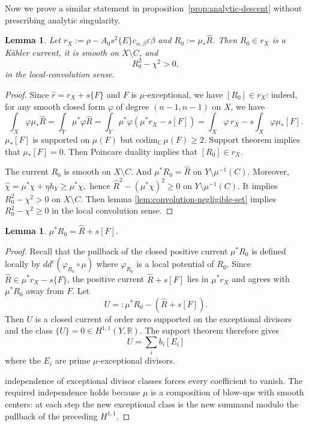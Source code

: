 \documentclass[reqno]{amsart}
\theoremstyle{remark}
\def\R{\mathbb{R}}
\def\C{\mathbb{C}}
\newcommand{\ddc}{dd^c}
\newcommand{\cab}{c_{\alpha,\beta}}
\theoremstyle{plain}
\newtheorem{lemma}[thm]{Lemma}
\begin{document}
Now we prove a similar statement in proposition~\ref{prop:analytic-descent} without prescribing analytic singularity. 
\begin{lemma}
\label{lem:raw-pushdown}
Let $r_X:=\rho-A_0s^2\{E\}\cab\varepsilon\beta$ and $R_0:=\mu_*\widehat R$.  Then $R_0\in r_X$ is a K\"ahler
current, it is smooth on $X\setminus C$, and
\[
 R_0^2-\chi^2>0,
\]
in the local-convolution sense.
\end{lemma}
\begin{proof}
    Since $\widehat{r}=r_X+s\{F\}$ and $F$ is $\mu$-exceptional, we have $[R_0]\in r_X$: indeed, for any smooth closed form $\varphi$ of degree $(n-1,n-1)$ on $X$, we have \[
    \int_X\varphi \mu_*\widehat{R}=\int_Y\mu^*\varphi \widehat{R}=\int_{Y}\mu^*\varphi( \mu^* r_X-s[F])=\int_X\varphi\,r_X-s\int_X\varphi \mu_*[F].
    \]
    $\mu_*[F]$ is supported on $\mu(F)$ but $\text{codim}_\C\,\mu(F)\geq 2$. Support theorem implies that $\mu_*[F]=0$. Then Poincare duality implies that $[R_0]\in r_X. $

    The current $R_0$ is smooth on $X\setminus C$. And $\mu^* R_0=\widehat{R}$ on $Y\setminus \mu^{-1}(C)$. Moreover, $\widehat{\chi}=\mu^*\chi+\eta h_Y\geq \mu^*\chi,$ hence $
    \widehat{R}^2-(\mu^*\chi)^2\geq 0$ on $Y\setminus \mu^{-1}(C)$. It implies $R_0^2-\chi^2>0$ on $X\setminus C$. Then lemma \ref{lem:convolution-negligible-set} implies $R_0^2-\chi^2\geq 0$ in the local convolution sense. 
\end{proof}

\begin{lemma}\label{lem:raw-pullback}
$\mu^*R_0=\hat{R}+s[F]$. 
\end{lemma}
\begin{proof}
  Recall that the pullback of the closed positive current $\mu^*R_0$ is defined locally by $\ddc (\varphi_{R_0}\circ\mu)$ where $\varphi_{R_0}$ is a local potential of $R_0$.   Since
$\widehat R\in \mu^*r_X-s\{F\}$, the positive current
$\widehat R+s[F]$ lies in $\mu^*r_X$ and agrees with
$\mu^*R_0$ away from $F$.  Let \[
U=:\mu^*R_0-(\widehat{R}+s[F]).\]
 Then $U$ is a closed current of order zero supported on the exceptional divisors and the class $\{U\}=0\in H^{1,1}(Y,\R)$. The support theorem therefore gives \[
 U=\sum_{i}b_i[E_i]
 \] where the $E_i$ are prime $\mu$-exceptional divisors. 




 independence of exceptional
divisor classes forces every coefficient to vanish.  The required
independence holds because $\mu$ is a composition of blow-ups with
smooth centers: at each step the new exceptional class is the new
summand modulo the pullback of the preceding $H^{1,1}$. 
\end{proof}
\end{document}
